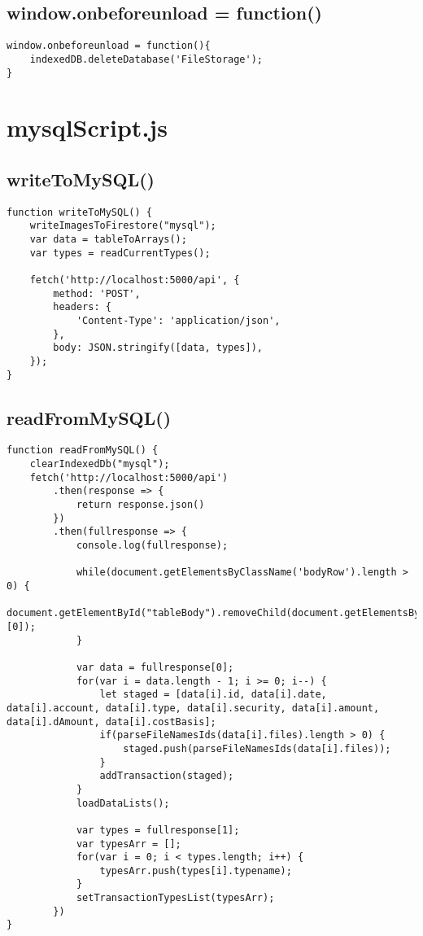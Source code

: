 \documentclass[letterpaper]{article}
\begin{document}
\subsection{window.onbeforeunload = function()}

\begin{lstlisting}[firstnumber=1]
window.onbeforeunload = function(){
    indexedDB.deleteDatabase('FileStorage');
}
\end{lstlisting}

\newpage

\section{mysqlScript.js}

\subsection{writeToMySQL()}

\begin{lstlisting}[firstnumber=1]
function writeToMySQL() {
    writeImagesToFirestore("mysql");
    var data = tableToArrays();
    var types = readCurrentTypes();

    fetch('http://localhost:5000/api', {
        method: 'POST',
        headers: {
            'Content-Type': 'application/json',
        },
        body: JSON.stringify([data, types]),
    });
}
\end{lstlisting}

\subsection{readFromMySQL()}

\begin{lstlisting}[firstnumber=15]
function readFromMySQL() {
    clearIndexedDb("mysql");
    fetch('http://localhost:5000/api')
        .then(response => {
            return response.json()
        })
        .then(fullresponse => {
            console.log(fullresponse);

            while(document.getElementsByClassName('bodyRow').length > 0) {
                document.getElementById("tableBody").removeChild(document.getElementsByClassName('bodyRow')[0]);
            }

            var data = fullresponse[0];
            for(var i = data.length - 1; i >= 0; i--) {
                let staged = [data[i].id, data[i].date, data[i].account, data[i].type, data[i].security, data[i].amount, data[i].dAmount, data[i].costBasis];
                if(parseFileNamesIds(data[i].files).length > 0) {
                    staged.push(parseFileNamesIds(data[i].files));
                }
                addTransaction(staged);
            }
            loadDataLists();

            var types = fullresponse[1];
            var typesArr = [];
            for(var i = 0; i < types.length; i++) {
                typesArr.push(types[i].typename);
            }
            setTransactionTypesList(typesArr);
        })
}
\end{lstlisting}
\end{document}
